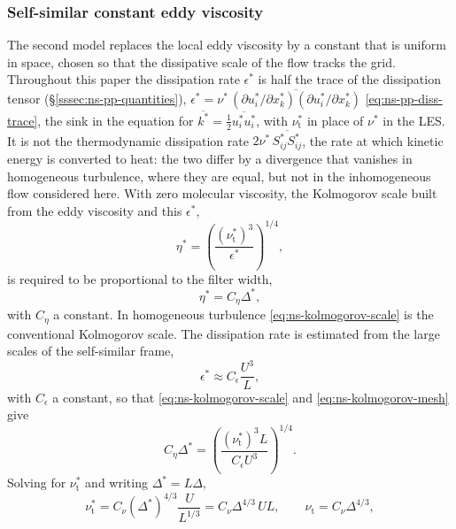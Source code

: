 \documentclass{article}
\begin{document}
\subsubsection{Self-similar constant eddy viscosity}\label{sssec:ns-sgs-constant}
The second model replaces the local eddy viscosity by a constant that is
uniform in space, chosen so that the dissipative scale of the flow tracks the
grid. Throughout this paper the dissipation rate $\epsilon^*$ is half the
trace of the dissipation tensor (\S\ref{sssec:ns-pp-quantities}),
$\epsilon^* = \nu^*\, \overline{(\partial u_i^*/\partial x_k^*)(\partial u_i^*/\partial x_k^*)}$
\eqref{eq:ns-pp-diss-trace}, the sink in the equation for
$\overline{k^*} = \tfrac{1}{2}\overline{u_i^* u_i^*}$, with $\nu_{\mathrm{t}}^*$ in place of
$\nu^*$ in the LES. It is not the thermodynamic dissipation rate
$2\nu^*\, \overline{S_{ij}^* S_{ij}^*}$, the rate at which kinetic energy is
converted to heat: the two differ by a divergence that vanishes in homogeneous
turbulence, where they are equal, but not in the inhomogeneous flow
considered here. With zero molecular viscosity, the Kolmogorov scale built
from the eddy viscosity and this $\epsilon^*$,
\begin{equation}\label{eq:ns-kolmogorov-scale}
  \eta^* = \left( \frac{(\nu_{\mathrm{t}}^*)^3}{\epsilon^*} \right)^{1/4},
\end{equation}
is required to be proportional to the filter width,
\begin{equation}\label{eq:ns-kolmogorov-mesh}
  \eta^* = C_\eta \Delta^*,
\end{equation}
with $C_\eta$ a constant. In homogeneous turbulence
\eqref{eq:ns-kolmogorov-scale} is the conventional Kolmogorov scale. The
dissipation rate is estimated from the large scales of the self-similar frame,
\begin{equation}\label{eq:ns-eps-estimate}
  \epsilon^* \approx C_\epsilon \frac{U^3}{L},
\end{equation}
with $C_\epsilon$ a constant, so that \eqref{eq:ns-kolmogorov-scale} and
\eqref{eq:ns-kolmogorov-mesh} give
\begin{equation}
  C_\eta \Delta^* = \left( \frac{(\nu_{\mathrm{t}}^*)^3 L}{C_\epsilon U^3} \right)^{1/4}.
\end{equation}
Solving for $\nu_{\mathrm{t}}^*$ and writing $\Delta^* = L \Delta$,
\begin{equation}\label{eq:ns-constant-viscosity}
  \nu_{\mathrm{t}}^* = C_\nu (\Delta^*)^{4/3} \frac{U}{L^{1/3}} = C_\nu \Delta^{4/3}\, U L,
  \qquad
  \nu_{\mathrm{t}} = C_\nu \Delta^{4/3},
\end{equation}
\end{document}
